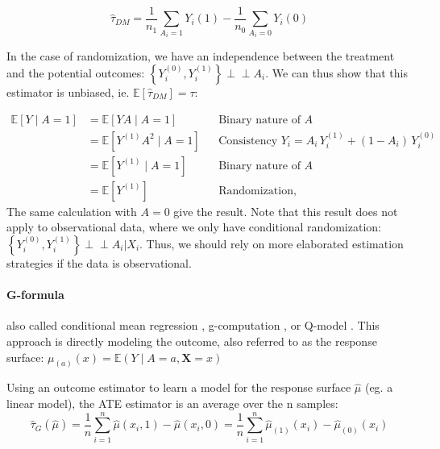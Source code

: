 \documentclass[french,12pt,twoside,a4paper]{book}
\newcommand{\indep}{\perp \!\!\! \perp}
\begin{document}
\begin{appendices}
\begin{background_box_left}
    \begin{equation}
      \hat \tau_{DM} = \frac{1}{n_1} \sum_{A_i=1} Y_i(1) - \frac{1}{n_0} \sum_{A_i=0} Y_i(0)
    \end{equation}

    In the case of randomization, we have an independence between the treatment
    and the potential outcomes: $\left\{Y_{i}^{(0)}, Y_{i}^{(1)}\right\} \indep
      A_{i}$. We can thus show that this estimator is unbiased, ie.
    $\mathbb{E}[\hat \tau_{DM}] = \tau$:

    \begin{align*}
      \mathbb{E}\left[Y \mid A =1\right] & = \mathbb{E}\left[YA \mid  A=1\right]         &  & \text{Binary nature of $A$}                                       \\
                                         & = \mathbb{E}\left[Y^{(1)}A^2 \mid  A=1\right] &  & \text{Consistency $Y_i = A_i \, Y_i^{(1)} + (1-A_i)\, Y_i^{(0)}$} \\
                                         & = \mathbb{E}\left[Y^{(1)} \mid  A=1\right]    &  & \text{Binary nature of $A$}                                       \\
                                         & = \mathbb{E}\left[ Y^{(1)}\right]             &  & \text{Randomization,}
    \end{align*}
    The same calculation with $A=0$ give the result. Note that this result does
    not apply to observational data, where we only have conditional
    randomization: $\left\{Y_{i}^{(0)}, Y_{i}^{(1)}\right\} \indep A_{i} | X_i$.
    Thus, we should rely on more elaborated estimation strategies if the data is
    observational.

    \paragraph{G-formula} also called conditional mean regression
    \citep{wendling2018comparing}, g-computation \citep{robins_role_1986}, or
    Q-model \citep{snowden2011implementation}. This approach is directly modeling
    the outcome, also referred to as the response surface: $\mu_{(a)}(x)
      =\mathbb{E}\left(Y \mid A=a, \mathbf{X}=x\right)$

    Using an outcome estimator to learn a model for the response surface $\hat
      \mu$ (eg. a linear model), the ATE estimator is an average over the n samples:
    \begin{equation}
      \hat{\tau}_G(\hat \mu) = \frac{1}{n} \sum_{i=1}^n \hat \mu(x_i, 1) - \hat \mu(x_i, 0) = \frac{1}{n} \sum_{i=1}^n \hat \mu_{(1)}(x_i) - \hat \mu_{(0)}(x_i)
    \end{equation}


\end{background_box_left}
\end{appendices}
\end{document}
